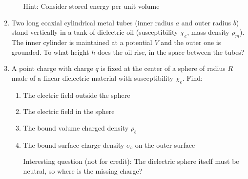 \begin{enumerate}
\begin{enumerate}
      Hint: Consider stored energy per unit volume

    \end{enumerate}

  \item Two long coaxial cylindrical metal tubes (inner radius $a$ and outer radius $b$) stand vertically in a tank of dielectric oil (susceptibility $\chi_e$, mass density $\rho_m$).  The inner cylinder is maintained at a potential $V$ and the outer one is grounded. To what height $h$ does the oil rise, in the space between the tubes?

  \item A point charge with charge $q$ is fixed at the center of a sphere of radius $R$ made of a linear dielectric material with susceptibility $\chi_e$. Find:

    \begin{enumerate}

      \item The electric field outside the sphere

      \item The electric field in the sphere

      \item The bound volume charged density $\rho_b$

      \item The bound surface charge density $\sigma_b$ on the outer surface

      Interesting question (not for credit): The dielectric sphere itself must be neutral, so where is the missing charge?

    \end{enumerate}

\end{enumerate}



